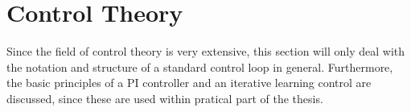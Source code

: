
\chapter{Control Theory}
Since the field of control theory is very extensive, this section will only deal with the notation and structure of a standard control loop in general. Furthermore, the basic principles of a PI controller and an iterative learning control are discussed, since these are used within pratical part of the thesis.
